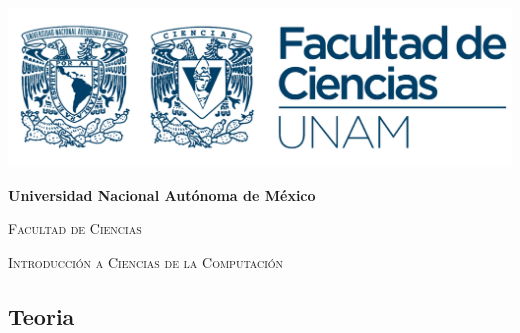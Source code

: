 \documentclass{article}
\begin{document}
\begin{titlepage}
{\includegraphics[width=1\textwidth]{img/FCiencias logo.png}\par}
\vspace{1cm}
\centering
{\bfseries\huge Universidad Nacional Autónoma de México \par}
\vspace{1cm}
{\scshape\huge Facultad de Ciencias \par}
\vspace{2cm}
\vspace{2cm}
{\scshape\Large Introducción a Ciencias de la Computación \par}
\vfill

\end{titlepage}
\subsection*{Teoria }
\end{document}
